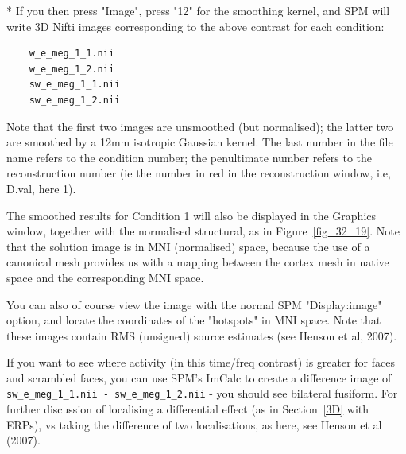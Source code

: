 * If you then press "Image", press "12" for the smoothing kernel, and SPM will write 3D Nifti images corresponding to the above contrast for each condition:
\begin{verbatim}
	w_e_meg_1_1.nii
	w_e_meg_1_2.nii
	sw_e_meg_1_1.nii
	sw_e_meg_1_2.nii
\end{verbatim}
Note that the first two images are unsmoothed (but normalised); the latter two are smoothed by a 12mm isotropic Gaussian kernel. The last number in the file name refers to the condition number; the penultimate number refers to the reconstruction number (ie the number in red in the reconstruction window, i.e, D.val, here 1).

The smoothed results for Condition 1 will also be displayed in the Graphics window, together with the normalised structural, as in Figure~\ref{fig_32_19}. Note that the solution image is in MNI (normalised) space, because the use of a canonical mesh provides us with a mapping between the cortex mesh in native space and the corresponding MNI space.

You can also of course view the image with the normal SPM "Display:image" option, and locate the coordinates of the "hotspots" in MNI space. Note that these images contain RMS (unsigned) source estimates (see Henson et al, 2007).

If you want to see where activity (in this time/freq contrast) is greater for faces and scrambled faces, you can use SPM's ImCalc to create a difference image of \verb!sw_e_meg_1_1.nii - sw_e_meg_1_2.nii! - you should see bilateral fusiform. For further discussion of localising a differential effect (as in Section~\ref{3D} with ERPs), vs taking the difference of two localisations, as here, see Henson et al (2007).

	

